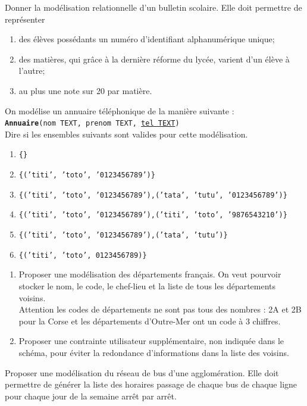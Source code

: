 \begin{exercice}[]
	Donner la modélisation relationnelle d'un bulletin scolaire. Elle doit permettre de représenter
	\begin{enumerate}
		\item 	des élèves possédants un numéro d'identifiant alphanumérique unique;
		\item 	des matières, qui grâce à la dernière réforme du lycée, varient d'un élève à l'autre;
		\item 	au plus une note sur 20 par matière.
	\end{enumerate}
\end{exercice}

\begin{exercice}[]
	On modélise un annuaire téléphonique de la manière suivante :\\
	
	\texttt{\textbf{Annuaire}(nom TEXT, prenom TEXT, \uline{tel TEXT})}\\
	
	Dire si les ensembles suivants sont valides pour cette modélisation.
	\begin{enumerate}
		\item 	\texttt{\{\}}
		\item 	\texttt{\{('titi', 'toto', '0123456789')\}}
		\item 	\texttt{\{('titi', 'toto', '0123456789'),('tata', 'tutu', '0123456789')\}}
		\item 	\texttt{\{('titi', 'toto', '0123456789'),('titi', 'toto', '9876543210')\}}
		\item 	\texttt{\{('titi', 'toto', '0123456789'),('tata', 'tutu')\}}
		\item 	\texttt{\{('titi', 'toto', 0123456789)\}}
	\end{enumerate}
\end{exercice}

\begin{exercice}[]
	\begin{enumerate}
		\item 	Proposer une modélisation des départements français. On veut pourvoir stocker le nom, le code, le chef-lieu et la liste de tous les départements voisins.\\
		      Attention les codes de départements ne sont pas tous des nombres : 2A et 2B pour la Corse et les départements d'Outre-Mer ont un code à 3 chiffres.\\
		\item 	Proposer une contrainte utilisateur supplémentaire, non indiquée dans le schéma, pour éviter la redondance d'informations dans la liste des voisins.
	\end{enumerate}
\end{exercice}

\begin{exercice}[]
	Proposer une modélisation du réseau de bus d'une agglomération. Elle doit permettre de générer la liste des horaires passage de chaque bus de chaque ligne pour chaque jour de la semaine arrêt par arrêt.
\end{exercice}

